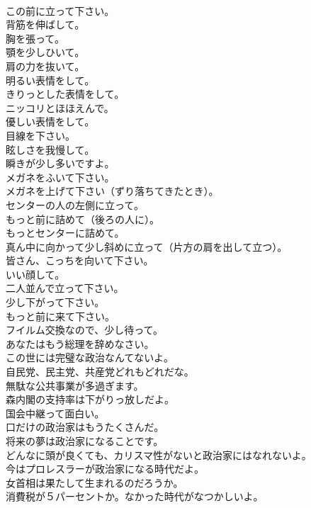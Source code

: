 \documentclass[8pt]{extreport}
\begin{document}
\begin{CJK}{UTF8}{min}
\\	この前に立って下さい。	
\\	背筋を伸ばして。	
\\	胸を張って。	
\\	顎を少しひいて。	
\\	肩の力を抜いて。	
\\	明るい表情をして。	
\\	きりっとした表情をして。	
\\	ニッコリとほほえんで。	
\\	優しい表情をして。	
\\	目線を下さい。	
\\	眩しさを我慢して。	
\\	瞬きが少し多いですよ。	
\\	メガネをふいて下さい。	
\\	メガネを上げて下さい（ずり落ちてきたとき）。	
\\	センターの人の左側に立って。	
\\	もっと前に詰めて（後ろの人に）。	
\\	もっとセンターに詰めて。	
\\	真ん中に向かって少し斜めに立って（片方の肩を出して立つ）。	
\\	皆さん、こっちを向いて下さい。	
\\	いい顔して。	
\\	二人並んで立って下さい。	
\\	少し下がって下さい。	
\\	もっと前に来て下さい。	
\\	フイルム交換なので、少し待って。	
\\	あなたはもう総理を辞めなさい。	
\\	この世には完璧な政治なんてないよ。	
\\	自民党、民主党、共産党どれもどれだな。	
\\	無駄な公共事業が多過ぎます。	
\\	森内閣の支持率は下がりっ放しだよ。	
\\	国会中継って面白い。	
\\	口だけの政治家はもうたくさんだ。	
\\	将来の夢は政治家になることです。	
\\	どんなに頭が良くても、カリスマ性がないと政治家にはなれないよ。	
\\	今はプロレスラーが政治家になる時代だよ。	
\\	女首相は果たして生まれるのだろうか。	
\\	消費税が５パーセントか。なかった時代がなつかしいよ。	

\end{CJK}
\end{document}
